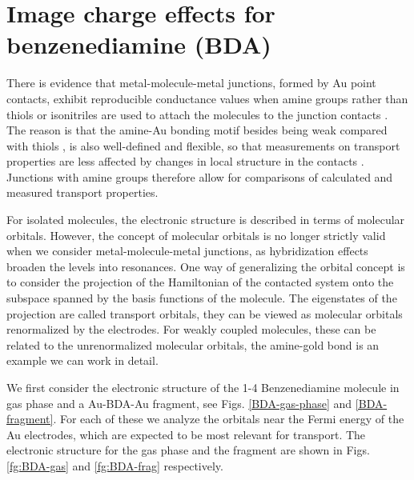 \documentclass[aip,jcp,a4paper,reprint,floatfix,superscriptaddress]{revtex4-1}
\begin{document}
\section{Image charge effects for benzenediamine (BDA)} \label{Sec:BDA}

There is evidence that metal-molecule-metal junctions, formed by Au point contacts, exhibit reproducible conductance values when amine groups rather than thiols or isonitriles are used to attach the molecules to the junction contacts \cite{Venkataraman2006}. The reason is that the amine-Au bonding motif besides being weak compared with thiols \cite{Hakkinen2012}, is also well-defined and flexible, so that measurements on transport properties are less affected by changes in local structure in the contacts \cite{Quek2007,Venkataraman2007}. Junctions with amine groups therefore allow for comparisons of calculated and measured transport properties.

For isolated molecules, the electronic structure is described in terms of molecular orbitals. However, the concept of molecular orbitals is no longer strictly valid when we consider metal-molecule-metal junctions, as hybridization effects broaden the levels into resonances. One way of generalizing the orbital concept is to consider the projection of the Hamiltonian of the contacted system onto the subspace spanned by the basis functions of the molecule. The eigenstates of the projection are called transport orbitals, they can be viewed as molecular orbitals renormalized by the electrodes. For weakly coupled molecules, these can be related to the unrenormalized molecular orbitals, the amine-gold bond is an example we can work in detail.




We first consider the electronic structure of the 1-4 Benzenediamine molecule in gas phase and a Au-BDA-Au fragment, see Figs. \ref{BDA-gas-phase} and \ref{BDA-fragment}. For each of these we analyze the orbitals near the Fermi energy of the Au electrodes, which are expected to be most relevant for transport. The electronic structure for the gas phase and the fragment are shown in Figs. \ref{fg:BDA-gas} and \ref{fg:BDA-frag} respectively.
\end{document}
